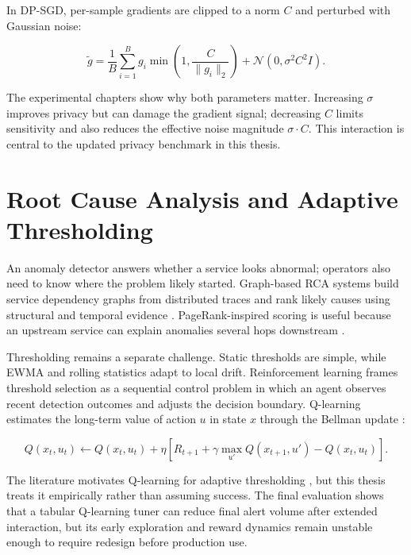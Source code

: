 In DP-SGD, per-sample gradients are clipped to a norm $C$ and perturbed with
Gaussian noise:

\begin{equation}
    \tilde{g} =
    \frac{1}{B}\sum_{i=1}^{B}
    g_i \min\left(1,\frac{C}{\|g_i\|_2}\right)
    +
    \mathcal{N}(0,\sigma^2 C^2 I).
    \label{eq:bg_dpsgd}
\end{equation}

The experimental chapters show why both parameters matter. Increasing
$\sigma$ improves privacy but can damage the gradient signal; decreasing $C$
limits sensitivity and also reduces the effective noise magnitude
$\sigma \cdot C$. This interaction is central to the updated privacy benchmark
in this thesis.

\section{Root Cause Analysis and Adaptive Thresholding}
\label{sec:bg_rca_thresholding}

An anomaly detector answers whether a service looks abnormal; operators also
need to know where the problem likely started. Graph-based RCA systems build
service dependency graphs from distributed traces and rank likely causes using
structural and temporal evidence \cite{li2018microrank, zhang2019rootcause,
fu2020root}. PageRank-inspired scoring is useful because an upstream service can
explain anomalies several hops downstream \cite{page1999pagerank, brin1998anatomy}.

Thresholding remains a separate challenge. Static thresholds are simple, while
EWMA and rolling statistics adapt to local drift. Reinforcement learning frames
threshold selection as a sequential control problem in which an agent observes
recent detection outcomes and adjusts the decision boundary. Q-learning estimates
the long-term value of action $u$ in state $x$ through the Bellman update
\cite{watkins1992qlearning, sutton2018reinforcement}:

\begin{equation}
    Q(x_t,u_t) \leftarrow Q(x_t,u_t) +
    \eta \left[
    R_{t+1} + \gamma \max_{u'}Q(x_{t+1},u') - Q(x_t,u_t)
    \right].
    \label{eq:bg_qlearning}
\end{equation}

The literature motivates Q-learning for adaptive thresholding
\cite{liu2020rlthreshold}, but this thesis treats it empirically rather than
assuming success. The final evaluation shows that a tabular Q-learning tuner can
reduce final alert volume after extended interaction, but its early exploration
and reward dynamics remain unstable enough to require redesign before production
use.

